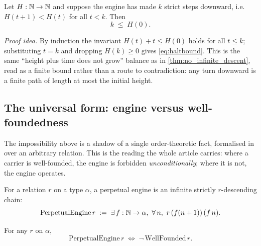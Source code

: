 \begin{theorem}\label{thm:turned_engine_halts}
\green{}\; Let $H:\mathbb{N}\to\mathbb{N}$ and suppose the engine has made $k$ strict steps downward, i.e.
$H(t+1)<H(t)$ for all $t<k$. Then
\begin{equation}\label{eq:haltbound}
  k \;\le\; H(0).
\end{equation}
\end{theorem}

\emph{Proof idea.} By induction the invariant $H(t)+t\le H(0)$ holds for all $t\le k$; substituting
$t=k$ and dropping $H(k)\ge 0$ gives \cref{eq:haltbound}. This is the same ``height plus time does
not grow'' balance as in \cref{thm:no_infinite_descent}, read as a finite bound rather than a route
to contradiction: any turn downward is a finite path of length at most the initial height.

\subsection{The universal form: engine versus well-foundedness}

The impossibility above is a shadow of a single order-theoretic fact, formalised in
 over an arbitrary relation. This is the reading the whole article
carries: where a carrier is well-founded, the engine is forbidden \emph{unconditionally}; where it
is not, the engine operates.

\begin{definition}\label{thm:PerpetualEngine}
For a relation $r$ on a type $\alpha$, a perpetual engine is an infinite strictly $r$-descending
chain:
\begin{equation}\label{eq:perpetualengine}
  \mathrm{PerpetualEngine}\,r \;:=\; \exists\, f:\mathbb{N}\to\alpha,\ \forall\, n,\ r\,(f(n+1))\,(f\,n).
\end{equation}
\end{definition}

\begin{theorem}\label{thm:perpetualEngine_iff_not_wellFounded}
\green{}\; For any $r$ on $\alpha$,
\begin{equation}\label{eq:dividingline}
  \mathrm{PerpetualEngine}\,r \;\Longleftrightarrow\; \neg\,\mathrm{WellFounded}\,r.
\end{equation}
\end{theorem}


